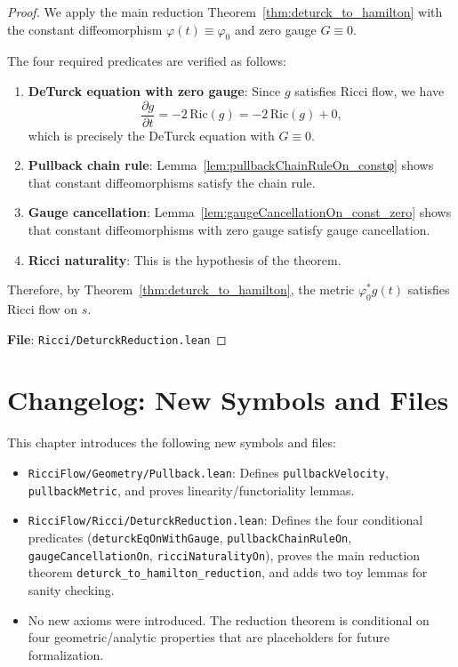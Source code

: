 \begin{proof}
\leanok
{}
We apply the main reduction Theorem~\ref{thm:deturck_to_hamilton} with the constant diffeomorphism $\varphi(t) \equiv \varphi_0$ and zero gauge $G \equiv 0$.

The four required predicates are verified as follows:
\begin{enumerate}
\item \textbf{DeTurck equation with zero gauge}: Since $g$ satisfies Ricci flow, we have
\[
\frac{\partial g}{\partial t} = -2 \, \mathrm{Ric}(g) = -2 \, \mathrm{Ric}(g) + 0,
\]
which is precisely the DeTurck equation with $G \equiv 0$.

\item \textbf{Pullback chain rule}: Lemma~\ref{lem:pullbackChainRuleOn_constφ} shows that constant diffeomorphisms satisfy the chain rule.

\item \textbf{Gauge cancellation}: Lemma~\ref{lem:gaugeCancellationOn_const_zero} shows that constant diffeomorphisms with zero gauge satisfy gauge cancellation.

\item \textbf{Ricci naturality}: This is the hypothesis of the theorem.
\end{enumerate}

Therefore, by Theorem~\ref{thm:deturck_to_hamilton}, the metric $\varphi_0^* g(t)$ satisfies Ricci flow on $s$.

\textbf{File}: \texttt{Ricci/DeturckReduction.lean}
\end{proof}

\section{Changelog: New Symbols and Files}

This chapter introduces the following new symbols and files:
\begin{itemize}
\item \texttt{RicciFlow/Geometry/Pullback.lean}: Defines \texttt{pullbackVelocity}, \texttt{pullbackMetric}, and proves linearity/functoriality lemmas.
\item \texttt{RicciFlow/Ricci/DeturckReduction.lean}: Defines the four conditional predicates (\texttt{deturckEqOnWithGauge}, \texttt{pullbackChainRuleOn}, \texttt{gaugeCancellationOn}, \texttt{ricciNaturalityOn}), proves the main reduction theorem \texttt{deturck\_to\_hamilton\_reduction}, and adds two toy lemmas for sanity checking.
\item No new axioms were introduced. The reduction theorem is conditional on four geometric/analytic properties that are placeholders for future formalization.
\end{itemize}

